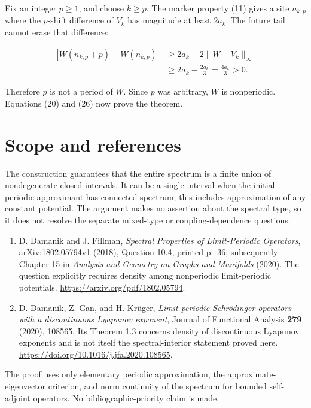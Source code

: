 \documentclass[11pt,a4paper]{article}
\providecommand{\tightlist}{\setlength{\itemsep}{0pt}\setlength{\parskip}{0pt}}
\begin{document}
Fix an integer \(p\geq1\), and choose \(k\geq p\). The marker property
(11) gives a site \(n_{k,p}\) where the \(p\)-shift difference of
\(V_k\) has magnitude at least \(2a_k\). The future tail cannot erase
that difference:

\[
\begin{aligned}
|W(n_{k,p}+p)-W(n_{k,p})|
&\geq2a_k-2\|W-V_k\|_\infty\\
&\geq2a_k-\frac{2a_k}{3}
=\frac{4a_k}{3}>0.
\end{aligned}
\]

Therefore \(p\) is not a period of \(W\). Since \(p\) was arbitrary,
\(W\) is nonperiodic. Equations (20) and (26) now prove the theorem.

\hypertarget{1031-scope-and-references}{%
\section{Scope and references}\label{1031-scope-and-references}}

The construction guarantees that the entire spectrum is a finite union
of nondegenerate closed intervals. It can be a single interval when the
initial periodic approximant has connected spectrum; this includes
approximation of any constant potential. The argument makes no assertion
about the spectral type, so it does not resolve the separate mixed-type
or coupling-dependence questions.

\begin{enumerate}
\raggedright
\def\labelenumi{\arabic{enumi}.}
\tightlist
\item
  D. Damanik and J. Fillman, \emph{Spectral Properties of Limit-Periodic
  Operators}, arXiv:1802.05794v1 (2018), Question 10.4, printed p.~36;
  subsequently Chapter 15 in \emph{Analysis and Geometry on Graphs and
  Manifolds} (2020). The question explicitly requires density among
  nonperiodic limit-periodic potentials.
  \url{https://arxiv.org/pdf/1802.05794}.
\item
  D. Damanik, Z. Gan, and H. Krüger, \emph{Limit-periodic Schrödinger
  operators with a discontinuous Lyapunov exponent}, Journal of
  Functional Analysis \textbf{279} (2020), 108565. Its Theorem 1.3
  concerns density of discontinuous Lyapunov exponents and is not itself
  the spectral-interior statement proved here.
  \url{https://doi.org/10.1016/j.jfa.2020.108565}.
\end{enumerate}

The proof uses only elementary periodic approximation, the
approximate-eigenvector criterion, and norm continuity of the spectrum
for bounded self-adjoint operators. No bibliographic-priority claim is
made.
\end{document}
